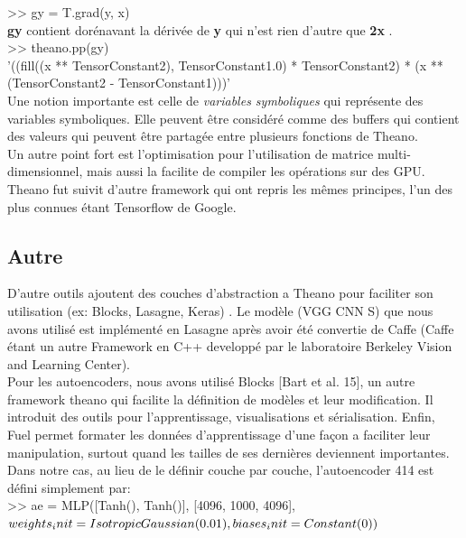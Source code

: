 >> gy = T.grad(y, x)\\

\textbf{gy} contient dorénavant la dérivée de \textbf{y} qui n'est rien d'autre que \textbf{2x} .\\

>> theano.pp(gy)\\
 '((fill((x ** TensorConstant{2}), TensorConstant{1.0}) * TensorConstant{2}) * (x ** (TensorConstant{2} - TensorConstant{1})))'\\
 
Une notion importante est celle de \textit{variables symboliques} qui représente des variables symboliques. Elle peuvent être considéré comme des buffers qui contient des valeurs qui peuvent être partagée entre plusieurs fonctions de Theano.\\

Un autre point fort est l'optimisation pour l'utilisation de matrice multi-dimensionnel, mais aussi la facilite de compiler les opérations sur des GPU.\\

Theano fut suivit d'autre framework qui ont repris les mêmes principes, l'un des plus connues étant Tensorflow de Google.

\subsection{Autre}
D'autre outils ajoutent des couches d'abstraction a Theano pour faciliter son utilisation (ex: Blocks, Lasagne, Keras) .
Le modèle (VGG CNN S) que nous avons utilisé est implémenté en Lasagne après avoir été convertie de Caffe (Caffe étant un autre Framework en C++ developpé par le laboratoire Berkeley Vision and Learning Center).\\

Pour les autoencoders, nous avons utilisé Blocks [Bart et al. 15], un autre framework theano qui facilite la définition de modèles et leur modification. Il introduit des outils pour l'apprentissage, visualisations et sérialisation. Enfin, Fuel permet formater les données d'apprentissage d'une façon a faciliter leur manipulation, surtout quand les tailles de ses dernières deviennent importantes.\\

Dans notre cas, au lieu de le définir couche par couche, l'autoencoder 414 est défini simplement par:\\

>> ae = MLP([Tanh(), Tanh()], [4096, 1000, 4096],
$              weights_init=IsotropicGaussian(0.01),
              biases_init=Constant(0))\\
 $             

